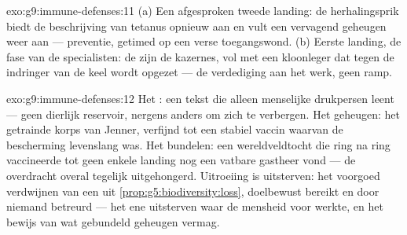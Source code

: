 \begin{solution}{exo:g9:immune-defenses:11}
(a) Een afgesproken tweede landing: de herhalingsprik biedt de
beschrijving van tetanus opnieuw aan en vult een vervagend geheugen
weer aan --- preventie, getimed op een verse toegangswond. (b)
Eerste landing, de fase van de specialisten: de  zijn de
kazernes, vol met een kloonleger dat tegen de indringer van de keel
wordt opgezet --- de verdediging aan het werk, geen ramp.
\end{solution}

\begin{solution}{exo:g9:immune-defenses:12}
Het : een tekst die alleen menselijke drukpersen leent ---
geen dierlijk reservoir, nergens anders om zich te verbergen. Het
geheugen: het getrainde korps van Jenner, verfijnd tot een stabiel
vaccin waarvan de bescherming levenslang was. Het bundelen: een
wereldveldtocht die ring na ring vaccineerde tot geen enkele
landing nog een vatbare gastheer vond --- de overdracht overal
tegelijk uitgehongerd. Uitroeiing is uitsterven: het voorgoed
verdwijnen van een  uit
\cref{prop:g5:biodiversity:loss}, doelbewust bereikt en door
niemand betreurd --- het ene uitsterven waar de mensheid voor
werkte, en het bewijs van wat gebundeld geheugen vermag.
\end{solution}

